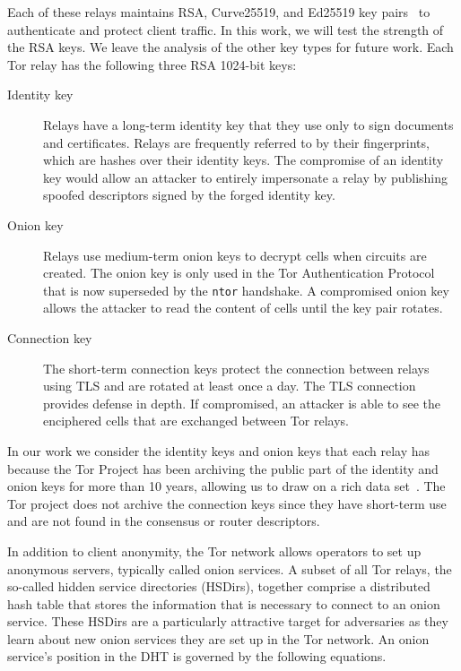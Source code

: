 Each of these relays maintains RSA, Curve25519, and Ed25519 key
pairs~\cite[\S~1.1]{torspec} to authenticate and protect client traffic. In this
work, we will test the strength of the RSA keys.  We leave the analysis of the
other key types for future work.  Each Tor relay has the following three RSA
1024-bit keys:

\begin{description}
	\item[Identity key] Relays have a long-term identity key that they use only
		to sign documents and certificates.  Relays are frequently referred to
		by their fingerprints, which are hashes over their identity keys.  The
		compromise of an identity key would allow an attacker to entirely
		impersonate a relay by publishing spoofed descriptors signed by the
		forged identity key.

	\item[Onion key]  Relays use medium-term onion keys to decrypt cells when
		circuits are created.  The onion key is only used in the Tor
		Authentication Protocol that is now superseded by the \texttt{ntor}
		handshake.  A compromised onion key allows the attacker to read the
		content of cells until the key pair rotates.

	\item[Connection key] The short-term connection keys protect the connection
		between relays using TLS and are rotated at least once a day.  The TLS
		connection provides defense in depth.  If compromised, an attacker is
		able to see the enciphered cells that are exchanged between Tor relays.
\end{description}

In our work we consider the identity keys and onion keys that each relay 
has because the Tor Project has been archiving the public part of the 
identity and onion keys for more than 10 years, allowing us to draw on a 
rich data set~\cite{collector}. The Tor project does not archive the 
connection keys since they have short-term use and are not found
in the consensus or router descriptors.

In addition to client anonymity, the Tor network allows operators to set up
anonymous servers, typically called onion services.  A subset of all Tor relays,
the so-called hidden service directories (HSDirs), together comprise a
distributed hash table that stores the information that is necessary to connect
to an onion service.  These HSDirs are a particularly attractive target for
adversaries as they learn about new onion services they are set up in the Tor
network.  An onion service's position in the DHT is governed by the following
equations.


